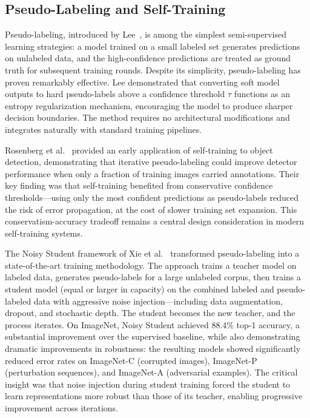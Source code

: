 \subsection{Pseudo-Labeling and Self-Training}\label{subsec:pseudo_labeling}

Pseudo-labeling, introduced by Lee~\cite{lee2013pseudo}, is among the simplest semi-supervised learning strategies: a model trained on a small labeled set generates predictions on unlabeled data, and the high-confidence predictions are treated as ground truth for subsequent training rounds. Despite its simplicity, pseudo-labeling has proven remarkably effective. Lee demonstrated that converting soft model outputs to hard pseudo-labels above a confidence threshold $\tau$ functions as an entropy regularization mechanism, encouraging the model to produce sharper decision boundaries. The method requires no architectural modifications and integrates naturally with standard training pipelines.

Rosenberg et al.~\cite{rosenberg2005semi} provided an early application of self-training to object detection, demonstrating that iterative pseudo-labeling could improve detector performance when only a fraction of training images carried annotations. Their key finding was that self-training benefited from conservative confidence thresholds---using only the most confident predictions as pseudo-labels reduced the risk of error propagation, at the cost of slower training set expansion. This conservatism-accuracy tradeoff remains a central design consideration in modern self-training systems.

The Noisy Student framework of Xie et al.~\cite{xie2020self} transformed pseudo-labeling into a state-of-the-art training methodology. The approach trains a teacher model on labeled data, generates pseudo-labels for a large unlabeled corpus, then trains a student model (equal or larger in capacity) on the combined labeled and pseudo-labeled data with aggressive noise injection---including data augmentation, dropout, and stochastic depth. The student becomes the new teacher, and the process iterates. On ImageNet, Noisy Student achieved 88.4\% top-1 accuracy, a substantial improvement over the supervised baseline, while also demonstrating dramatic improvements in robustness: the resulting models showed significantly reduced error rates on ImageNet-C (corrupted images), ImageNet-P (perturbation sequences), and ImageNet-A (adversarial examples). The critical insight was that noise injection during student training forced the student to learn representations more robust than those of its teacher, enabling progressive improvement across iterations.


